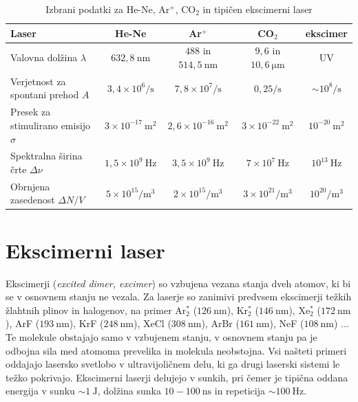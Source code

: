 \begin{table}
\small
\begin{center}
\begin{tabular}{|l|c|c|c|c|}\hline
Laser & He-Ne & Ar$^+$ & CO$_2$ & ekscimer\\ \hline
Valovna dolžina  $\lambda$ & $632,8~\si{\nano\metre}$& $488$ in
$514,5~\si{\nano\metre}$ & $9,6$ in $10,6~\si{\micro\metre}$ & UV
\\ \hline
Verjetnost za spontani prehod $A$ & $3,4 \times 10^6/\si{\second}$ & 
$7,8 \times 10^7/\si{\second}$ & $0,25/\si{\second}$ & $\sim 10^8/\si{\second}$ \\ \hline
Presek za stimulirano emisijo $\sigma$ & $3 \times 10^{-17}~\si{\metre}^2$&  $2,6 \times 10^{-16}~\si{\metre}^2$ & $3 \times 10^{-22}~\si{\metre}^2$ & $ 10^{-20}~\si{\metre}^2$ \\ \hline
Spektralna širina črte $\Delta \nu$ & $1,5 \times 10^{9}~\si{\hertz}$ & 
$3,5 \times 10^{9}~\si{\hertz}$ &$7 \times 10^{7}~\si{\hertz}$ & $10^{13}~\si{\hertz}$ \\ \hline
Obrnjena zasedenost $\Delta N/V$ & $5 \times 10^{15}/\si{\metre}^3$ & $2 \times 10^{15}/\si{\metre}^3$ & $3 \times 10^{21}/\si{\metre}^3$ & $10^{20}/\si{\metre}^3$\\ \hline
\end{tabular}
\caption{Izbrani podatki za He-Ne, Ar$^+$, CO$_2$ in tipičen ekscimerni laser}
\label{tab:Ar}
\end{center}
\end{table}

\section{Ekscimerni laser}
Ekscimerji ({\it excited dimer, excimer}) so vzbujena vezana stanja dveh atomov, 
ki bi se v osnovnem stanju ne vezala. Za laserje so zanimivi predvsem ekscimerji
težkih žlahtnih plinov in halogenov, na primer Ar$_2^*$ ($126~\si{\nano\metre}$), 
Kr$_2^*$ ($146~\si{\nano\metre}$), Xe$_2^*$ ($172~\si{\nano\metre}$),
ArF ($193~\si{\nano\metre}$), KrF ($248~\si{\nano\metre}$), 
XeCl ($308~\si{\nano\metre}$), ArBr ($161~\si{\nano\metre}$), 
NeF ($108~\si{\nano\metre}$) ... Te molekule obstajajo samo v vzbujenem stanju,
v osnovnem stanju pa je odbojna sila med atomoma prevelika in molekula neobstojna.
Vsi našteti primeri oddajajo lasersko svetlobo v
ultravijoličnem delu, ki ga drugi laserski sistemi le težko pokrivajo. 
Ekscimerni laserji delujejo v sunkih, pri čemer je tipična oddana energija v sunku 
$\sim 1~\si{\joule}$, dolžina sunka $10-100~\si{\nano\second}$ in repeticija 
$\sim 100~\si{\hertz}$.

